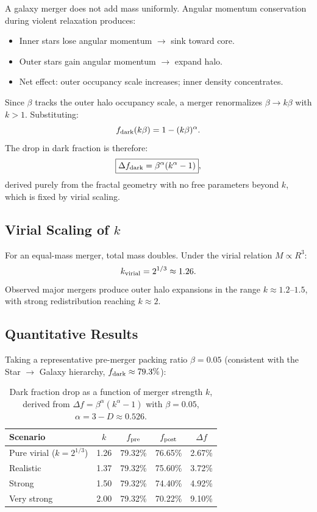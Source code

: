 \documentclass[11pt,a4paper]{article}
\begin{document}
A galaxy merger does not add mass uniformly. Angular momentum conservation
during violent relaxation produces:
\begin{itemize}
    \item Inner stars lose angular momentum $\to$ sink toward core.
    \item Outer stars gain angular momentum $\to$ expand halo.
    \item Net effect: outer occupancy scale increases; inner density concentrates.
\end{itemize}
Since $\beta$ tracks the outer halo occupancy scale, a merger renormalizes
$\beta \to k\beta$ with $k > 1$. Substituting:
\[
f_{\rm dark}(k\beta) = 1 - (k\beta)^{\alpha}.
\]
The drop in dark fraction is therefore:
\[
\boxed{\Delta f_{\rm dark} = \beta^{\alpha}(k^{\alpha} - 1)},
\]
derived purely from the fractal geometry with no free parameters beyond $k$,
which is fixed by virial scaling.

\subsection{Virial Scaling of $k$}

For an equal-mass merger, total mass doubles. Under the virial relation
$M \propto R^3$:
\[
k_{\rm virial} = 2^{1/3} \approx 1.26.
\]
Observed major mergers produce outer halo expansions in the range $k \approx
1.2$--$1.5$, with strong redistribution reaching $k \approx 2$.

\subsection{Quantitative Results}

Taking a representative pre-merger packing ratio $\beta = 0.05$
(consistent with the Star $\to$ Galaxy hierarchy, $f_{\rm dark} \approx 79.3\%$):

\begin{table}[h]
\centering
\caption{Dark fraction drop as a function of merger strength $k$,
derived from $\Delta f = \beta^\alpha(k^\alpha - 1)$ with
$\beta = 0.05$, $\alpha = 3-D \approx 0.526$.}
\begin{tabular}{lcccc}
\hline
Scenario & $k$ & $f_{\rm pre}$ & $f_{\rm post}$ & $\Delta f$ \\
\hline
Pure virial ($k = 2^{1/3}$) & 1.26 & 79.32\% & 76.65\% & 2.67\% \\
Realistic                   & 1.37 & 79.32\% & 75.60\% & 3.72\% \\
Strong                      & 1.50 & 79.32\% & 74.40\% & 4.92\% \\
Very strong                 & 2.00 & 79.32\% & 70.22\% & 9.10\% \\
\hline
\end{tabular}
\label{tab:merger-drop}
\end{table}
\end{document}

